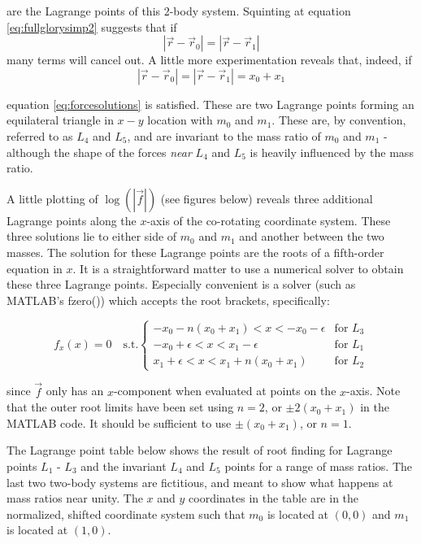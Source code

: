 \documentclass[twoside,11pt]{article}
\begin{document}
are the Lagrange points of this 2-body system. Squinting at equation \eqref{eq:fullglorysimp2} suggests that if 
\begin{equation}
\left|\vec{r}-\vec{r}_0\right| = \left|\vec{r}-\vec{r}_1\right|
\end{equation}
many terms will cancel out. A little more experimentation reveals that, indeed, if
\begin{equation}
\left|\vec{r}-\vec{r}_0\right| = \left|\vec{r}-\vec{r}_1\right| = x_0 + x_1
\end{equation}

equation \ref{eq:forcesolutions} is satisfied. These are two Lagrange points forming an equilateral triangle in $x-y$ location with $m_0$ and $m_1$. These are, by convention, referred to as $L_4$ and $L_5$, and are invariant to the mass ratio of $m_0$ and $m_1$ - although the shape of the forces \textit{near} $L_4$ and $L_5$ is heavily influenced by the mass ratio.

A little plotting of $\log\left(\left|\vec{f}\right|\right)$ (see figures below) reveals three additional Lagrange points along the $x$-axis of the co-rotating coordinate system. These three solutions lie to either side of $m_0$ and $m_1$ and another between the two masses. The solution for these Lagrange points are the roots of a fifth-order equation in $x$. It is a straightforward matter to use a numerical solver to obtain these three Lagrange points. Especially convenient is a solver (such as MATLAB's fzero()) which accepts the root brackets, specifically:

\begin{equation}
f_x(x) = 0 \quad \text{s.t.} \begin{cases}
     -x_0 - n (x_0+x_1) < x < -x_0 - \epsilon &\text{for $L_3$}\\
     -x_0 + \epsilon < x < x_1 - \epsilon &\text{for $L_1$}\\
     x_1 + \epsilon < x < x_1 + n (x_0+x_1) &\text{for $L_2$}
  \end{cases} \nonumber
\end{equation}

since $\vec{f}$ only has an $x$-component when evaluated at points on the $x$-axis. Note that the outer root limits have been set using $n=2$, or $\pm 2 (x_0+x_1)$ in the MATLAB code. It should be sufficient to use $\pm (x_0+x_1)$, or $n=1$.

The Lagrange point table below shows the result of root finding for Lagrange points $L_1$ - $L_3$ and the invariant $L_4$ and $L_5$ points for a range of mass ratios. The last two two-body systems are fictitious, and meant to show what happens at mass ratios near unity. The $x$ and $y$ coordinates in the table are in the normalized, shifted coordinate system such that $m_0$ is located at $\left(0,0\right)$ and $m_1$ is located at $\left(1,0\right)$.
\end{document}
